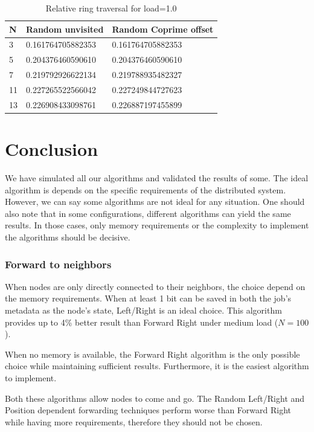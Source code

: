 \documentclass[10pt,a4paper]{article}
\begin{document}
\begin{table}[h!]
\centering
\begin{tabular}{|l|l|l|} \hline
N	& Random unvisited	& Random Coprime offset \\ \hline
3	&   0.161764705882353 &  0.161764705882353 \\
5	&   0.204376460590610 &  0.204376460590610 \\
7	&   0.219792926622134 &  0.219788935482327 \\
11	&   0.227265522566042 &  0.227249844727623 \\
13	&   0.226908433098761 &  0.226887197455899 \\ \hline
\end{tabular}
\caption{Relative ring traversal for load=1.0}
\end{table}

\section{Conclusion}
\label{secconclusion}

We have simulated all our algorithms and validated the results of some. The ideal algorithm is depends on the specific requirements of the distributed system. However, we can say some algorithms are not ideal for any situation. One should also note that in some configurations, different algorithms can yield the same results. In those cases, only memory requirements or the complexity to implement the algorithms should be decisive.

\subsubsection*{Forward to neighbors}
When nodes are only directly connected to their neighbors, the choice depend on the memory requirements. When at least 1 bit can be saved in both the job's metadata as the node's state, Left/Right is an ideal choice. This algorithm provides up to 4\% better result than Forward Right under medium load ($N=100$).

When no memory is available, the Forward Right algorithm is the only possible choice while maintaining sufficient results. Furthermore, it is the easiest algorithm to implement.

Both these algorithms allow nodes to come and go. The Random Left/Right and Position dependent forwarding techniques perform worse than Forward Right while having more requirements, therefore they should not be chosen.
\end{document}
